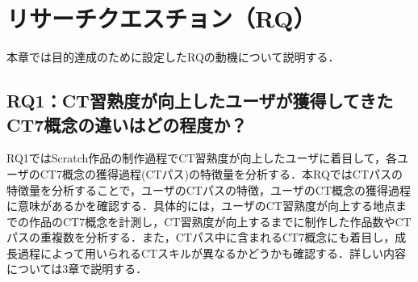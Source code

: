 \documentclass[11pt,dvipdfmx]{jreport}
\newcommand{\todo}[1]{\colorbox{yellow}{{\bf TODO}:}{\color{red} {\textbf{[#1]}}}}
\begin{document}



\section{リサーチクエスチョン（RQ）}
本章では目的達成のために設定したRQの動機について説明する．
\subsection{RQ1：CT習熟度が向上したユーザが獲得してきたCT7概念の違いはどの程度か？}
RQ1ではScratch作品の制作過程でCT習熟度が向上したユーザに着目して，各ユーザのCT7概念の獲得過程(CTパス)の特徴量を分析する．本RQではCTパスの特徴量を分析することで，ユーザのCTパスの特徴，ユーザのCT概念の獲得過程に意味があるかを確認する．具体的には，ユーザのCT習熟度が向上する地点までの作品のCT7概念を計測し，CT習熟度が向上するまでに制作した作品数やCTパスの重複数を分析する．また，CTパス中に含まれるCT7概念にも着目し，成長過程によって用いられるCTスキルが異なるかどうかも確認する．詳しい内容については3章で説明する．
\end{document}
